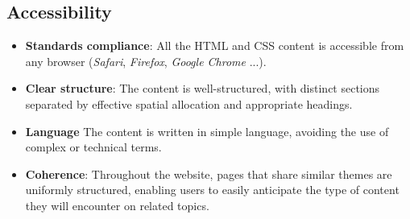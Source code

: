 \subsection{Accessibility}


\begin{itemize}
    \item\textbf{Standards compliance}: All the HTML and CSS content is accessible from any browser
            (\textit{Safari}, \textit{Firefox}, \textit{Google Chrome} ...).
    \item \textbf{Clear structure}: The content is well-structured, with distinct sections separated by effective
            spatial allocation and appropriate headings.
    \item \textbf{Language} The content is written in simple language, avoiding the use of complex or technical terms.
    \item \textbf{Coherence}: Throughout the website, pages that share similar themes are uniformly structured,
            enabling users to easily anticipate the type of content they will encounter on related topics.



\end{itemize}